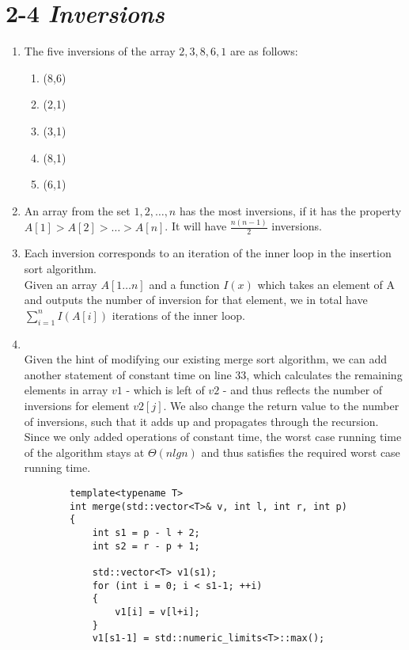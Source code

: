 \documentclass[11pt, letterpaper]{article}
\begin{document}
\section*{2-4 \textit{Inversions}}
\begin{enumerate}[label=\alph*)]
    \item
    The five inversions of the array ${2,3,8,6,1}$ are as follows:
        \begin{enumerate}
            \item (8,6)
            \item (2,1)
            \item (3,1)
            \item (8,1)
            \item (6,1)
        \end{enumerate}
    \item
        An array from the set ${1,2,\dots,n}$ has the most inversions, if it has the 
        property $A[1]>A[2]>\dots>A[n]$. It will have $\frac{n(n-1)}{2}$ inversions.
    \item
        Each inversion corresponds to an iteration of the inner loop in the insertion sort
        algorithm.\\
        Given an array $A[1\dots n]$ and a function $I(x)$ which takes an element of A
        and outputs the number of inversion for that element, we in total have 
        $\sum_{i=1}^{n} I(A[i])$ iterations of the inner loop.
     \item
         ~\\
        Given the hint of modifying our existing merge sort algorithm, we can 
        add another statement of constant time on line 33, which calculates the remaining
        elements in array $v1$ - which is left of $v2$ - and thus reflects the number
        of inversions for element $v2[j]$. We also change the return value to the number 
        of inversions, such that it adds up and propagates through the recursion. Since we 
        only added operations of constant time, the worst case running time of the algorithm stays at
        $\Theta (nlgn)$ and thus satisfies the required worst case running time.
        \begin{lstlisting}
        template<typename T>
        int merge(std::vector<T>& v, int l, int r, int p)
        {
            int s1 = p - l + 2;
            int s2 = r - p + 1;

            std::vector<T> v1(s1);
            for (int i = 0; i < s1-1; ++i)
            {
                v1[i] = v[l+i];
            }
            v1[s1-1] = std::numeric_limits<T>::max();


\end{lstlisting}
\end{enumerate}
\end{document}
